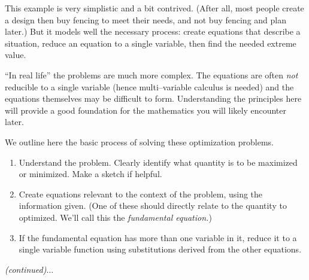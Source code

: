 This example is very simplistic and a bit contrived. (After all, most people create a design then buy fencing to meet their needs, and not buy fencing and plan later.) But it models well the necessary process: create equations that describe a situation, reduce an equation to a single variable, then find the needed extreme value.

``In real life'' the problems are much more complex. The equations are often \textit{not} reducible to a single variable (hence multi--variable calculus is needed) and the equations themselves may be difficult to form. Understanding the principles here will provide a good foundation for the mathematics you will likely encounter later.

We outline here the basic process of solving these optimization problems.
\enlargethispage{\baselineskip}
{}
{\begin{enumerate}
		\item		Understand the problem. Clearly identify what quantity is to be maximized or minimized. Make a sketch if helpful.
		\item		Create equations relevant to the context of the problem, using the information given. (One of these should directly relate to the quantity to optimized. We'll call this the \textit{fundamental equation.})
		\item		If the fundamental equation has more than one variable in it, reduce it to a single variable function using substitutions derived from the other equations.
		\end{enumerate}
\textit{\small (continued)$\ldots$}
}

